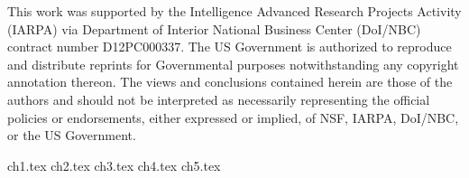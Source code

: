 \documentclass[12pt,dvips]{report}
\begin{document}
\vfill


This work was supported by the Intelligence Advanced Research Projects Activity
(IARPA) via Department of Interior National Business Center (DoI/NBC)
contract number D12PC000337. The US Government is authorized to
reproduce and distribute reprints for Governmental purposes
notwithstanding any copyright annotation thereon. The
views and conclusions contained herein are those of the authors and
should not be interpreted as necessarily representing the official
policies or endorsements, either expressed or implied, of NSF, IARPA,
DoI/NBC, or the US Government.

\pagebreak


\tableofcontents
\pagebreak

\listoffigures
\pagebreak

\listoftables
\pagebreak

\pagestyle{myheadings}

{ch1.tex}
{ch2.tex}
{ch3.tex}
{ch4.tex}
{ch5.tex}




%





\end{document}
